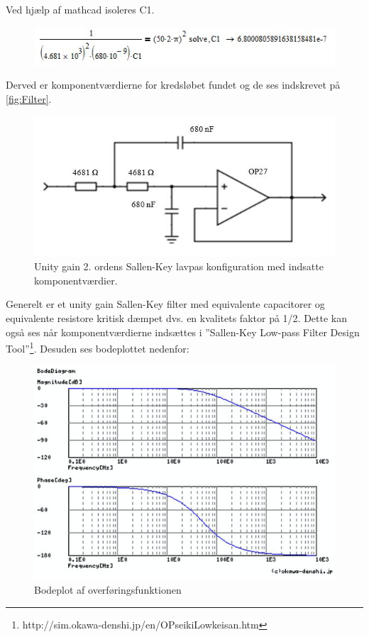 Ved hjælp af mathcad isoleres C1. 

\begin{figure}[H]
	\centering
	\includegraphics[width=1\textwidth]{Figurer/ligning7}
	\label{fig:lign7}
\end{figure}

Derved er komponentværdierne for kredsløbet fundet og de ses indskrevet på \ref{fig:Filter}. 

\begin{figure}[H]
	\centering
	\includegraphics[width=1\textwidth]{Figurer/FilterDesignMedKomponentvaerdier}
	\caption{Unity gain 2. ordens Sallen-Key lavpas konfiguration med indsatte komponentværdier.}
	\label{fig:Filter_K}
\end{figure}

Generelt er et unity gain Sallen-Key filter med equivalente capacitorer og equivalente resistore kritisk dæmpet dvs. en kvalitets faktor på 1/2. Dette kan også ses når komponentværdierne indsættes i ”Sallen-Key Low-pass Filter Design Tool”\footnote{http://sim.okawa-denshi.jp/en/OPseikiLowkeisan.htm}. Desuden ses bodeplottet nedenfor:

\begin{figure}[H]
	\centering
	\includegraphics[width=1\textwidth]{Figurer/Bodeplot}
	\caption[]{Bodeplot af overføringsfunktionen\footnotemark}
	\label{fig:Bodeplot}
\end{figure}


